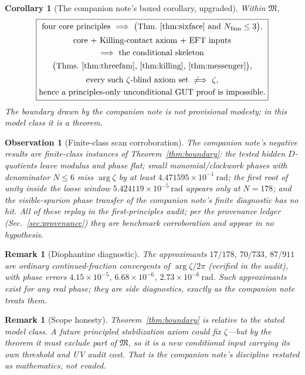 \documentclass[
  aps,
  prd,
  preprint,
  nofootinbib,
  superscriptaddress,
  longbibliography
]{revtex4-2}
\newtheorem{corollary}[theorem]{Corollary}
\newtheorem{observation}[theorem]{Observation}
\newtheorem{remark}[theorem]{Remark}
\begin{document}
\begin{corollary}[The companion note's boxed corollary, upgraded]
\label{cor:box}
Within \(\mathfrak M\),
\[
\boxed{
\begin{gathered}
\text{four core principles}\ \Longrightarrow\
 \bigl(\text{Thm.~\ref{thm:sixface} and }N_{\rm fam}\le3\bigr),\\[2pt]
\text{core + Killing-contact axiom + EFT inputs}\\
\Longrightarrow\ \text{the conditional skeleton}\\
\bigl(\text{Thms.~\ref{thm:threefam}, \ref{thm:killing},
\ref{thm:messenger}}\bigr),\\[2pt]
\text{every such }\zeta\text{-blind axiom set}\ \not\Longrightarrow\ \zeta ,\\
\text{hence a principles-only unconditional GUT proof is impossible.}
\end{gathered}
}
\]
The boundary drawn by the companion note is not provisional modesty; in
this model class it is a theorem.
\end{corollary}

\begin{observation}[Finite-class scan corroboration]
\label{obs:scans}
The companion note's negative results are finite-class instances of
Theorem~\ref{thm:boundary}: the tested hidden \(D\)-quotients leave modulus
and phase flat; small monomial/clockwork phases with denominator \(N\le6\)
miss \(\arg\zeta\) by at least \(4.471595\times10^{-1}\ \mathrm{rad}\); the
first root of unity inside the loose window
\(5.424119\times10^{-5}\ \mathrm{rad}\) appears only at \(N=178\); and the
visible-spurion phase transfer of the companion note's finite diagnostic
has no hit.  All of these replay in the first-principles audit; per the
provenance ledger (Sec.~\ref{sec:provenance}) they are benchmark
corroboration and appear in no hypothesis.
\end{observation}

\begin{remark}[Diophantine diagnostic]
The approximants \(17/178\), \(70/733\), \(87/911\) are ordinary
continued-fraction convergents of \(\arg\zeta/2\pi\) (verified in the
audit), with phase errors \(4.15\times10^{-5}\), \(6.68\times10^{-6}\),
\(2.73\times10^{-6}\ \mathrm{rad}\).  Such approximants exist for any real
phase; they are side diagnostics, exactly as the companion note treats
them.
\end{remark}

\begin{remark}[Scope honesty]
Theorem~\ref{thm:boundary} is relative to the stated model class.  A future
\emph{principled} stabilization axiom could fix \(\zeta\)---but by the
theorem it must exclude part of \(\mathfrak M\), so it is a new conditional
input carrying its own threshold and UV audit cost.  That is the companion
note's discipline restated as mathematics, not evaded.
\end{remark}
\end{document}
